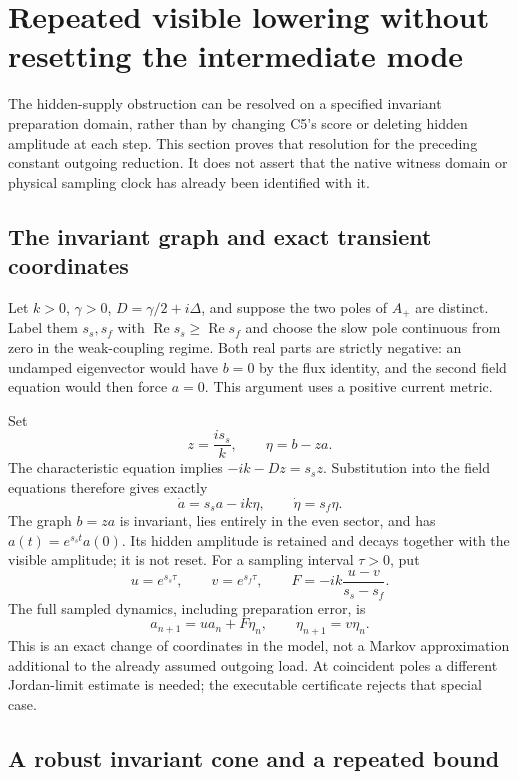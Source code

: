 \documentclass[11pt,a4paper]{article}
\begin{document}
\section{Repeated visible lowering without resetting the intermediate mode}
\label{sec:invariant-supply-cone}

The hidden-supply obstruction can be resolved on a specified
invariant preparation domain, rather than by changing C5's score
or deleting hidden amplitude at each step. This section proves
that resolution for the preceding constant outgoing reduction.
It does not assert that the native witness domain or physical
sampling clock has already been identified with it.

\subsection{The invariant graph and exact transient coordinates}

Let $k>0$, $\gamma>0$, $D=\gamma/2+i\Delta$, and suppose the
two poles of $A_+$ are distinct. Label them $s_s,s_f$ with
$\operatorname{Re}s_s\geq\operatorname{Re}s_f$ and choose the
slow pole continuous from zero in the weak-coupling regime.
Both real parts are strictly negative: an undamped eigenvector
would have $b=0$ by the flux identity, and the second field equation
would then force $a=0$. This argument uses a positive current metric.

Set
\[
 z=\frac{i s_s}{k},\qquad \eta=b-za.
\]
The characteristic equation implies
$-ik-Dz=s_sz$. Substitution into the field equations therefore
gives exactly
\[
 \dot a=s_s a-ik\eta,\qquad
 \dot\eta=s_f\eta.
\]
The graph $b=za$ is invariant, lies entirely in the even sector,
and has $a(t)=e^{s_st}a(0)$. Its hidden amplitude is retained and
decays together with the visible amplitude; it is not reset.
For a sampling interval $\tau>0$, put
\[
 u=e^{s_s\tau},\qquad v=e^{s_f\tau},\qquad
 F=-ik\frac{u-v}{s_s-s_f}.
\]
The full sampled dynamics, including preparation error, is
\[
 a_{n+1}=u a_n+F\eta_n,\qquad
 \eta_{n+1}=v\eta_n.
\]
This is an exact change of coordinates in the model, not a
Markov approximation additional to the already assumed outgoing
load. At coincident poles a different Jordan-limit estimate is
needed; the executable certificate rejects that special case.

\subsection{A robust invariant cone and a repeated bound}
\end{document}
